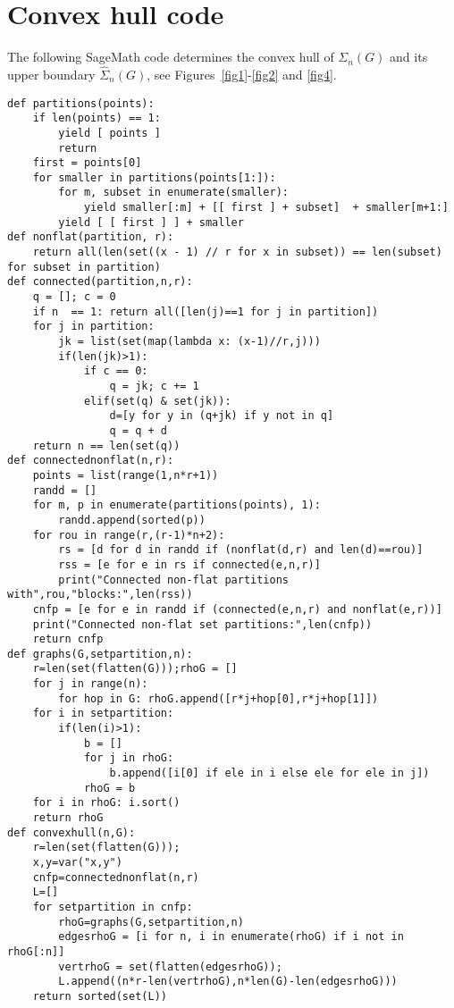 \documentclass[12pt]{article}
\numberwithin{equation}{section}
\begin{document}
\appendix

\section{Convex hull code}
\label{fjkldsf}
\noindent  
The following SageMath code determines the convex hull of $\Sigma_n(G)$ 
and its upper boundary $\widehat{\Sigma}_n(G)$,
see Figures~\ref{fig1}-\ref{fig2} and \ref{fig4}.

\medskip
\smallskip

\begin{lstlisting}
def partitions(points):
    if len(points) == 1:
        yield [ points ]
        return
    first = points[0]
    for smaller in partitions(points[1:]):
        for m, subset in enumerate(smaller):
            yield smaller[:m] + [[ first ] + subset]  + smaller[m+1:]
        yield [ [ first ] ] + smaller
def nonflat(partition, r):
    return all(len(set((x - 1) // r for x in subset)) == len(subset) for subset in partition)
def connected(partition,n,r):
    q = []; c = 0
    if n  == 1: return all([len(j)==1 for j in partition])
    for j in partition:
        jk = list(set(map(lambda x: (x-1)//r,j)))
        if(len(jk)>1):            
            if c == 0:
                q = jk; c += 1
            elif(set(q) & set(jk)):
                d=[y for y in (q+jk) if y not in q]
                q = q + d
    return n == len(set(q))
def connectednonflat(n,r):
    points = list(range(1,n*r+1))
    randd = []
    for m, p in enumerate(partitions(points), 1):
        randd.append(sorted(p))
    for rou in range(r,(r-1)*n+2):    
        rs = [d for d in randd if (nonflat(d,r) and len(d)==rou)]
        rss = [e for e in rs if connected(e,n,r)]
        print("Connected non-flat partitions with",rou,"blocks:",len(rss))
    cnfp = [e for e in randd if (connected(e,n,r) and nonflat(e,r))]
    print("Connected non-flat set partitions:",len(cnfp))
    return cnfp
def graphs(G,setpartition,n):
    r=len(set(flatten(G)));rhoG = []
    for j in range(n):
        for hop in G: rhoG.append([r*j+hop[0],r*j+hop[1]])
    for i in setpartition:
        if(len(i)>1):
            b = []
            for j in rhoG:
                b.append([i[0] if ele in i else ele for ele in j])
            rhoG = b
    for i in rhoG: i.sort()
    return rhoG
def convexhull(n,G):
    r=len(set(flatten(G)));
    x,y=var("x,y")
    cnfp=connectednonflat(n,r)
    L=[]
    for setpartition in cnfp: 
        rhoG=graphs(G,setpartition,n)
        edgesrhoG = [i for n, i in enumerate(rhoG) if i not in rhoG[:n]]
        vertrhoG = set(flatten(edgesrhoG));
        L.append((n*r-len(vertrhoG),n*len(G)-len(edgesrhoG)))
    return sorted(set(L))
\end{lstlisting}
\end{document}

